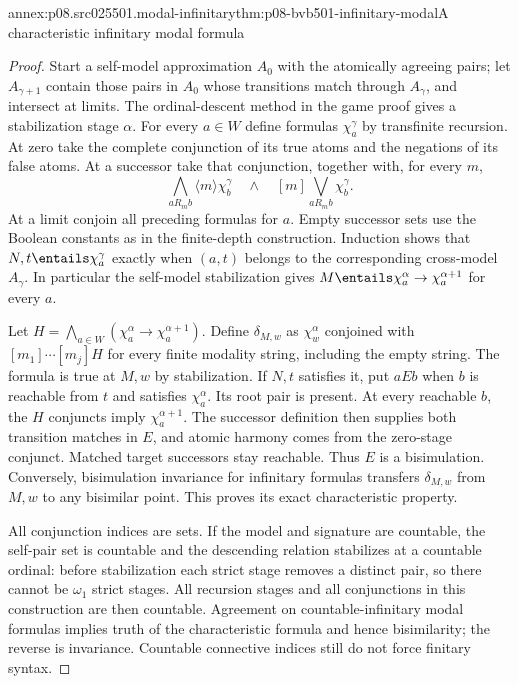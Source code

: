 \begin{annexitem}{annex:p08.src025501.modal-infinitary}{thm:p08-bvb501-infinitary-modal}{A characteristic infinitary modal formula}
\begin{proof}
Start a self-model approximation \(A_0\) with the atomically agreeing
pairs; let \(A_{\gamma+1}\) contain those pairs in \(A_0\) whose
transitions match through \(A_\gamma\), and intersect at limits.
The ordinal-descent method in the game proof gives a stabilization stage
\(\alpha\). For every \(a\in W\)
define formulas \(\chi_a^\gamma\) by transfinite recursion. At zero take
the complete conjunction of its true atoms and the negations of its false
atoms. At a successor take that conjunction, together with, for every \(m\),
\[
 \bigwedge_{aR_mb}\langle m\rangle\chi_b^\gamma
 \quad\land\quad [m]\bigvee_{aR_mb}\chi_b^\gamma.
\]
At a limit conjoin all preceding formulas for \(a\). Empty successor
sets use the Boolean constants as in the finite-depth construction.
Induction shows that \(N,t\entails\chi_a^\gamma\) exactly when
\((a,t)\) belongs to the corresponding cross-model \(A_\gamma\).
In particular the self-model stabilization gives
\(M\entails\chi_a^\alpha\to\chi_a^{\alpha+1}\) for every \(a\).

Let \(H=\bigwedge_{a\in W}(\chi_a^\alpha\to\chi_a^{\alpha+1})\).
Define \(\delta_{M,w}\) as \(\chi_w^\alpha\) conjoined with
\([m_1]\cdots[m_j]H\) for every finite modality string, including
the empty string. The formula is true at \(M,w\) by stabilization.
If \(N,t\) satisfies it, put \(aEb\) when \(b\) is reachable
from \(t\) and satisfies \(\chi_a^\alpha\). Its root pair is present.
At every reachable \(b\), the \(H\) conjuncts imply
\(\chi_a^{\alpha+1}\). The successor definition then supplies both
transition matches in \(E\), and atomic harmony comes from the
zero-stage conjunct. Matched target successors stay reachable. Thus \(E\)
is a bisimulation. Conversely, bisimulation invariance for infinitary
formulas transfers \(\delta_{M,w}\) from \(M,w\) to any bisimilar
point. This proves its exact characteristic property.

All conjunction indices are sets. If the model and signature are countable,
the self-pair set is countable and the descending relation stabilizes at
a countable ordinal: before stabilization each strict stage removes a
distinct pair, so there cannot be \(\omega_1\) strict stages.
All recursion stages and all conjunctions in this construction are then
countable. Agreement on countable-infinitary modal formulas implies truth
of the characteristic formula and hence bisimilarity; the reverse is
invariance. Countable connective indices still do not force finitary syntax.
\end{proof}
\end{annexitem}

